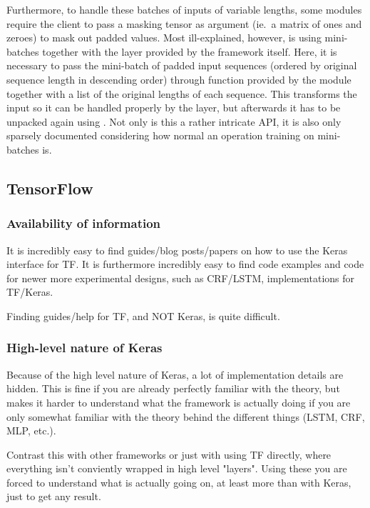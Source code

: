 Furthermore, to handle these batches of inputs of variable lengths, some modules
require the client to pass a masking tensor as argument (ie.\ a matrix of ones
and zeroes) to mask out padded values. Most ill-explained, however, is using
mini-batches together with the  layer provided by the framework
itself. Here, it is necessary to pass the mini-batch of padded input sequences
(ordered by original sequence length in descending order) through
 function provided by the 
module together with a list of the original lengths of each sequence. This
transforms the input so it can be handled properly by the  layer, but
afterwards it has to be unpacked again using . Not
only is this a rather intricate API, it is also only sparsely documented
considering how normal an operation training on mini-batches is.



\subsection{TensorFlow}

\subsubsection{Availability of information}

It is incredibly easy to find guides/blog posts/papers on how to use the Keras
interface for TF. It is furthermore incredibly easy to find code examples and
code for newer more experimental designs, such as CRF/LSTM, implementations for TF/Keras.

Finding guides/help for TF, and NOT Keras, is quite difficult.

\subsubsection{High-level nature of Keras}

Because of the high level nature of Keras, a lot of implementation details are hidden. This is fine if you are already perfectly familiar with the theory, but makes it harder to understand what the framework is actually doing if you are only somewhat familiar with the theory behind the different things  (LSTM, CRF, MLP, etc.).

Contrast this with other frameworks or just with using TF directly, where everything isn't conviently wrapped in high level "layers". Using these you are forced to understand what is actually going on, at least more than with Keras, just to get any result.

